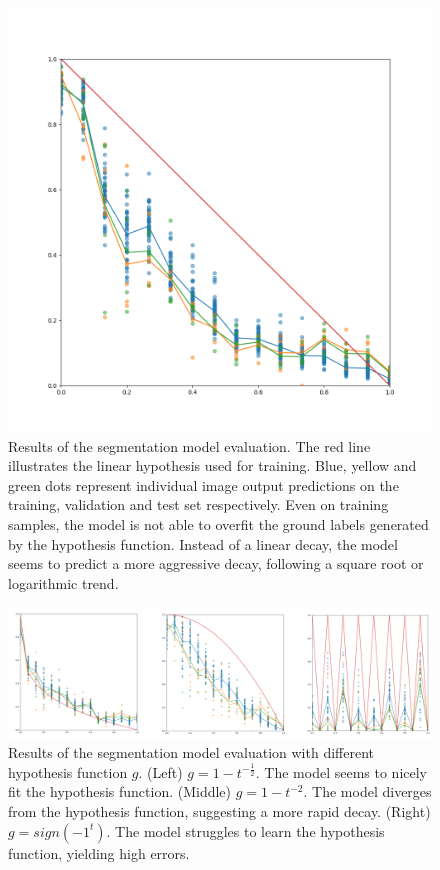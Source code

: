 \documentclass[10pt,twocolumn,letterpaper]{article}
\begin{document}
\begin{figure}[h]
\centering
\includegraphics[width=0.9\linewidth]{"./figures/Figure10"}
\caption{
Results of the segmentation model evaluation.
The red line illustrates the linear hypothesis used for training.
Blue, yellow and green dots represent individual image output predictions 
on the training, validation and test set respectively.
Even on training samples, the model is not able to overfit the ground labels 
generated by the hypothesis function.
Instead of a linear decay, the model seems to predict a more aggressive decay,
following a square root or logarithmic trend.  
}
\end{figure}

\begin{figure}[h!]
\centering
\includegraphics[width=0.9\linewidth]{"./figures/Figure11"}
\caption{
Results of the segmentation model evaluation with different hypothesis function $g$.
(Left) $g=1-t^{-\frac{1}{2}}$. The model seems to nicely fit the hypothesis function.
(Middle) $g=1-t^{-2}$. The model diverges from the hypothesis function, suggesting a more rapid decay.
(Right) $g=sign(-1^{t})$. The model struggles to learn the hypothesis function, yielding high errors.
}
\end{figure}
\end{document}
